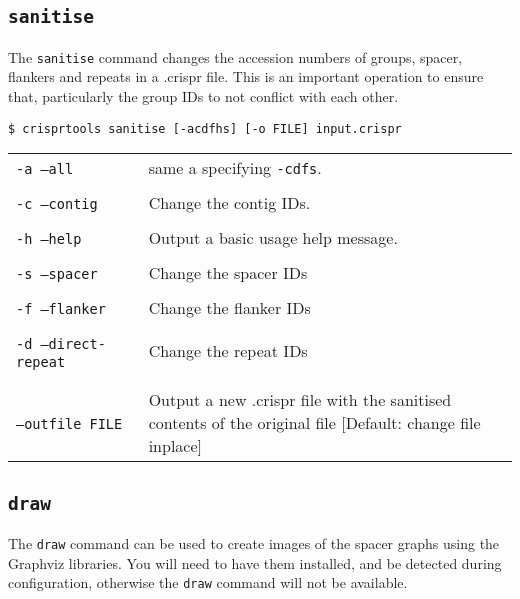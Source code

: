 \documentclass[11pt]{article} %
\newcommand{\optionflag}[1]{\texttt{-#1}}
\newcommand{\optionflagarg}[2]{\optionflag{#1}\ \texttt{#2}}
\newcommand{\longoptionflag}[1]{\texttt{--#1}}
\newcommand{\longoptionflagarg}[2]{\longoptionflag{#1}\ \texttt{#2}}
\newcommand{\combinedoptionflag}[2]{\optionflag{#1}\ \longoptionflag{#2}}
\newcommand{
	\combinedoptionflagarg}[3]{
		\shortstack[l]{
			\optionflagarg{#1}{#3} \\ \longoptionflagarg{#2}{#3}
		}
	}
\begin{document}
\subsection{\lstinline$sanitise$}
\label{sec:ctsanitise}
The \texttt{sanitise} command changes the accession numbers of groups, spacer, flankers and repeats in a .crispr file.  This is an important operation to ensure that, particularly the group IDs to not conflict with each other. 
\begin{lstlisting}
$ crisprtools sanitise [-acdfhs] [-o FILE] input.crispr
\end{lstlisting}
 \begin{longtable}{  l    p{10cm} }
 \combinedoptionflag{a}{all} & same a specifying \optionflag{cdfs}. \\ \\
 \combinedoptionflag{c}{contig} & Change the contig IDs. \\ \\
 \combinedoptionflag{h}{help} & Output a basic usage help message. \\ \\
\combinedoptionflag{s}{spacer} & Change the spacer IDs \\ \\
\combinedoptionflag{f}{flanker} & Change the flanker IDs \\ \\
\combinedoptionflag{d}{direct-repeat} & Change the repeat IDs \\ \\
\combinedoptionflagarg{o}{outfile}{FILE} & Output a new .crispr file with the sanitised contents of the original file [Default: change file inplace] \\ 

\end{longtable}
\subsection{\lstinline$draw$}
\label{sec:ctdraw}
The \texttt{draw} command can be used to create images of the spacer graphs using the Graphviz libraries.  You will need to have them installed, and be detected during configuration, otherwise the \texttt{draw} command will not be available. 
\end{document}
